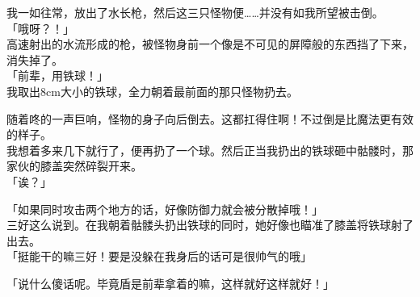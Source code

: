 我一如往常，放出了水长枪，然后这三只怪物便……并没有如我所望被击倒。\\

「哦呀？！」\\

高速射出的水流形成的枪，被怪物身前一个像是不可见的屏障般的东西挡了下来，消失掉了。\\

「前辈，用铁球！」\\

我取出8cm大小的铁球，全力朝着最前面的那只怪物扔去。

随着咚的一声巨响，怪物的身子向后倒去。这都扛得住啊！不过倒是比魔法更有效的样子。\\

我想着多来几下就行了，便再扔了一个球。然后正当我扔出的铁球砸中骷髅时，那家伙的膝盖突然碎裂开来。\\

「诶？」

「如果同时攻击两个地方的话，好像防御力就会被分散掉哦！」\\

三好这么说到。在我朝着骷髅头扔出铁球的同时，她好像也瞄准了膝盖将铁球射了出去。\\

「挺能干的嘛三好！要是没躲在我身后的话可是很帅气的哦」

「说什么傻话呢。毕竟盾是前辈拿着的嘛，这样就好这样就好！」\\

